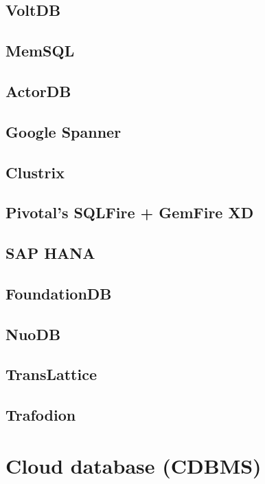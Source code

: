 \subsection{VoltDB}

\subsection{MemSQL}

\subsection{ActorDB}

\subsection{Google Spanner}

\subsection{Clustrix}

\subsection{Pivotal's SQLFire + GemFire XD}	

\subsection{SAP HANA}

\subsection{FoundationDB}

\subsection{NuoDB}

\subsection{TransLattice}

\subsection{Trafodion}


\section{Cloud database (CDBMS)}
\label{sec:Cloud_database}

